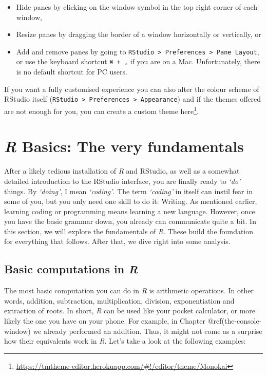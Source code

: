 \documentclass[
  letterpaper,
]{krantz}
\renewcommand{\href}[2]{#2\footnote{\url{#1}}}
\begin{document}
\begin{itemize}
\item
  Hide panes by clicking on the window symbol in the top right corner of
  each window,
\item
  Resize panes by dragging the border of a window horizontally or
  vertically, or
\item
  Add and remove panes by going to
  \texttt{RStudio\ \textgreater{}\ Preferences\ \textgreater{}\ Pane\ Layout},
  or use the keyboard shortcut \texttt{⌘\ +\ ,} if you are on a Mac.
  Unfortunately, there is no default shortcut for PC users.
\end{itemize}

If you want a fully customised experience you can also alter the colour
scheme of RStudio itself
(\texttt{RStudio\ \textgreater{}\ Preferences\ \textgreater{}\ Appearance})
and if the themes offered are not enough for you, you can create a
custom theme
\href{https://tmtheme-editor.herokuapp.com/\#!/editor/theme/Monokai}{here}.


\chapter{\texorpdfstring{\emph{R} Basics: The very
fundamentals}{R Basics: The very fundamentals}}\label{sec-r-basics-the-very-fundamentals}

After a likely tedious installation of \emph{R} and RStudio, as well as
a somewhat detailed introduction to the RStudio interface, you are
finally ready to \emph{`do'} things. By \emph{`doing'}, I mean
\emph{`coding'}. The term \emph{`coding'} in itself can instil fear in
some of you, but you only need one skill to do it: Writing. As mentioned
earlier, learning coding or programming means learning a new language.
However, once you have the basic grammar down, you already can
communicate quite a bit. In this section, we will explore the
fundamentals of \emph{R}. These build the foundation for everything that
follows. After that, we dive right into some analysis.

\section{\texorpdfstring{Basic computations in
\emph{R}}{Basic computations in R}}\label{sec-basic-computations-in-r}

The most basic computation you can do in \emph{R} is arithmetic
operations. In other words, addition, subtraction, multiplication,
division, exponentiation and extraction of roots. In short, \emph{R} can
be used like your pocket calculator, or more likely the one you have on
your phone. For example, in Chapter @ref(the-console-window) we already
performed an addition. Thus, it might not come as a surprise how their
equivalents work in \emph{R}. Let's take a look at the following
examples:
\end{document}
